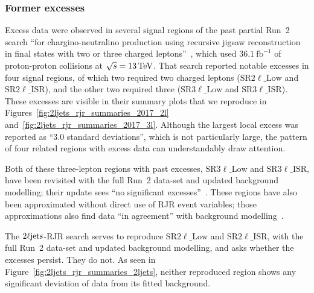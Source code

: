 \subsubsection{Former excesses}
Excess data were observed in several signal regions of the past partial Run~2
search ``for chargino-neutralino production using recursive
jigsaw reconstruction in final states with two or three charged
leptons''~\cite{atlas_rjr_23l_SUSY_2017_03},
which used $36.1~\mathrm{fb}^{-1}$ of proton-proton collisions at
$\sqrt{s} = 13\,\eV[T]$.
That search reported notable excesses in four signal regions, of which
two required two charged leptons
($\mathrm{SR}2\ell\_\mathrm{Low}$ and $\mathrm{SR}2\ell\_\mathrm{ISR}$),
and the other two required three
($\mathrm{SR}3\ell\_\mathrm{Low}$ and $\mathrm{SR}3\ell\_\mathrm{ISR}$).
These excesses are visible in their summary plots that we reproduce in
Figures~\ref{fig:2ljets_rjr_summaries_2017_2l}
and~\ref{fig:2ljets_rjr_summaries_2017_3l}.
Although the largest local excess was reported as ``$3.0$ standard deviations'',
which is not particularly large, the pattern of four related regions with
excess data can understandably draw attention.

Both of these three-lepton regions with past excesses,
$\mathrm{SR}3\ell\_\mathrm{Low}$ and $\mathrm{SR}3\ell\_\mathrm{ISR}$,
have been revisited with the full Run~2 data-set and updated background
modelling;
their update sees ``no significant excesses''~\cite{atlas_rjr_3l_SUSY_2019_09}.
These regions have also been approximated without direct use of RJR event
variables;
those approximations also find data ``in agreement'' with background
modelling~\cite{atlas_rjr_mimic_SUSY_2018_06}.

The $\twoljets$-RJR search serves to reproduce
$\mathrm{SR}2\ell\_\mathrm{Low}$ and $\mathrm{SR}2\ell\_\mathrm{ISR}$,
with the full Run~2 data-set and updated background modelling,
and asks whether the excesses persist.
They do not.
As seen in Figure~\ref{fig:2ljets_rjr_summaries_2ljets},
neither reproduced region shows any significant deviation of data from its
fitted background.

